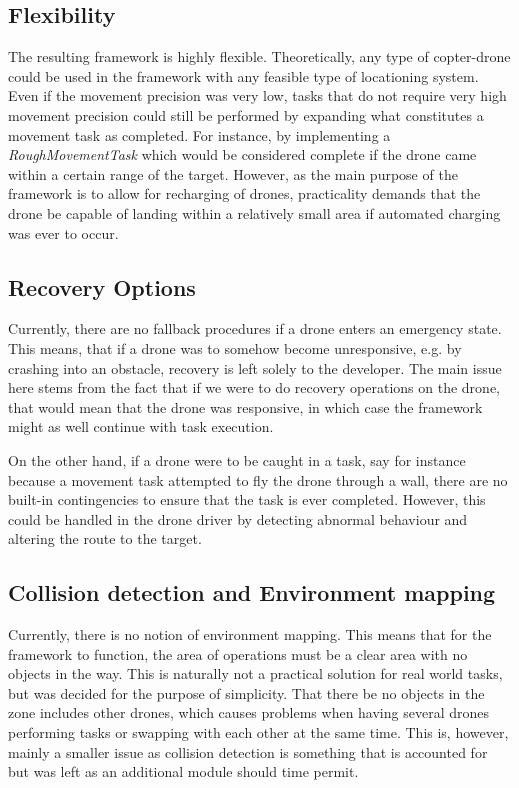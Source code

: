 \subsection{Flexibility}
The resulting framework is highly flexible. Theoretically, any type of copter-drone could be used in the framework with any feasible type of locationing system. Even if the movement precision was very low, tasks that do not require very high movement precision could still be performed by expanding what constitutes a movement task as completed. For instance, by implementing a \textit{RoughMovementTask} which would be considered complete if the drone came within a certain range of the target. However, as the main purpose of the framework is to allow for recharging of drones, practicality demands that the drone be capable of landing within a relatively small area if automated charging was ever to occur.

\subsection{Recovery Options}
Currently, there are no fallback procedures if a drone enters an emergency state. This means, that if a drone was to somehow become unresponsive, e.g. by crashing into an obstacle, recovery is left solely to the developer. The main issue here stems from the fact that if we were to do recovery operations on the drone, that would mean that the drone was responsive, in which case the framework might as well continue with task execution.

On the other hand, if a drone were to be caught in a task, say for instance because a movement task attempted to fly the drone through a wall, there are no built-in contingencies to ensure that the task is ever completed. However, this could be handled in the drone driver by detecting abnormal behaviour and altering the route to the target.

\subsection{Collision detection and Environment mapping}
Currently, there is no notion of environment mapping. This means that for the framework to function, the area of operations must be a clear area with no  objects in the way. This is naturally not a practical solution for real world tasks, but was decided for the purpose of simplicity. That there be no objects in the zone includes other drones, which causes problems when having several drones performing tasks or swapping with each other at the same time. This is, however, mainly a smaller issue as collision detection is something that is accounted for but was left as an additional module should time permit. 

